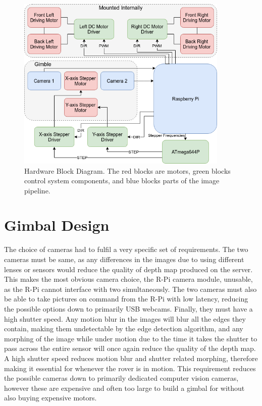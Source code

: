 \begin{figure}[H]
    \begin{center}
      \includegraphics[width=0.9\textwidth]{Figures/hardware.png}
      \caption[Hardware Block Diagram]{Hardware Block Diagram. The red blocks are motors, green blocks control system components, and blue blocks parts of the image pipeline.}
      \label{fig:hardware}
    \end{center}
\end{figure}

\section{Gimbal Design}

The choice of cameras had to fulfil a very specific set of requirements. The two cameras must be same, as any differences in the images due to using different lenses or sensors would reduce the quality of depth map produced on the server. This makes the most obvious camera choice, the R-Pi camera module, unusable, as the R-Pi cannot interface with two simultaneously. The two cameras must also be able to take pictures on command from the R-Pi with low latency, reducing the possible options down to primarily USB webcams. Finally, they must have a high shutter speed. Any motion blur in the images will blur all the edges they contain, making them undetectable by the edge detection algorithm, and any morphing of the image while under motion due to the time it takes the shutter to pass across the entire sensor will once again reduce the quality of the depth map. A high shutter speed reduces motion blur and shutter related morphing, therefore making it essential for whenever the rover is in motion. This requirement reduces the possible cameras down to primarily dedicated computer vision cameras, however these are expensive and often too large to build a gimbal for without also buying expensive motors.

